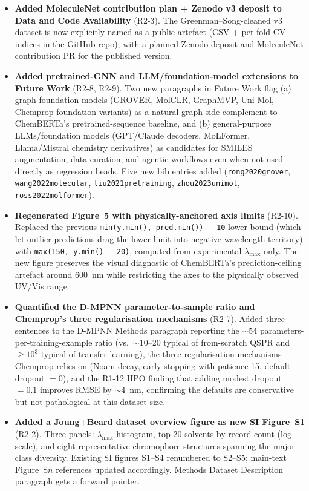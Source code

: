 \documentclass[11pt]{article}
\begin{document}
\begin{itemize}[leftmargin=2em]
  \item \textbf{Added MoleculeNet contribution plan + Zenodo v3 deposit to Data and Code Availability} (R2-3). The Greenman--Song-cleaned v3 dataset is now explicitly named as a public artefact (CSV + per-fold CV indices in the GitHub repo), with a planned Zenodo deposit and MoleculeNet contribution PR for the published version.
 \item \textbf{Added pretrained-GNN and LLM/foundation-model extensions to Future Work} (R2-8, R2-9). Two new paragraphs in Future Work flag (a) graph foundation models (GROVER, MolCLR, GraphMVP, Uni-Mol, Chemprop-foundation variants) as a natural graph-side complement to ChemBERTa's pretrained-sequence baseline, and (b) general-purpose LLMs/foundation models (GPT/Claude decoders, MoLFormer, Llama/Mistral chemistry derivatives) as candidates for SMILES augmentation, data curation, and agentic workflows even when not used directly as regression heads. Five new bib entries added (\texttt{rong2020grover}, \texttt{wang2022molecular}, \texttt{liu2021pretraining}, \texttt{zhou2023unimol}, \texttt{ross2022molformer}).
  \item \textbf{Regenerated Figure~5 with physically-anchored axis limits} (R2-10). Replaced the previous \texttt{min(y.min(), pred.min()) - 10} lower bound (which let outlier predictions drag the lower limit into negative wavelength territory) with \texttt{max(150, y.min() - 20)}, computed from experimental $\lambda_{\max}$ only. The new figure preserves the visual diagnostic of ChemBERTa's prediction-ceiling artefact around 600~nm while restricting the axes to the physically observed UV/Vis range.
  \item \textbf{Quantified the D-MPNN parameter-to-sample ratio and Chemprop's three regularisation mechanisms} (R2-7). Added three sentences to the D-MPNN Methods paragraph reporting the $\sim$54 parameters-per-training-example ratio (vs.\ $\sim$10--20 typical of from-scratch QSPR and $\geq 10^3$ typical of transfer learning), the three regularisation mechanisms Chemprop relies on (Noam decay, early stopping with patience 15, default dropout $= 0$), and the R1-12 HPO finding that adding modest dropout $= 0.1$ improves RMSE by $\sim$4~nm, confirming the defaults are conservative but not pathological at this dataset size.
  \item \textbf{Added a Joung+Beard dataset overview figure as new SI Figure~S1} (R2-2). Three panels: $\lambda_{\max}$ histogram, top-20 solvents by record count (log scale), and eight representative chromophore structures spanning the major class diversity. Existing SI figures S1--S4 renumbered to S2--S5; main-text Figure~S$n$ references updated accordingly. Methods Dataset Description paragraph gets a forward pointer.

\end{itemize}
\end{document}
